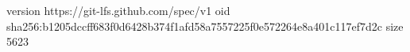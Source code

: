 version https://git-lfs.github.com/spec/v1
oid sha256:b1205dccff683f0d6428b374f1afd58a7557225f0e572264e8a401c117ef7d2c
size 5623
